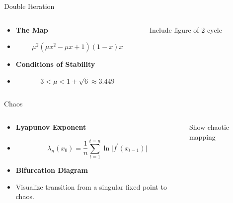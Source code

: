 \documentclass{beamer}
\begin{document}
\begin{frame}{Double Iteration}
	\begin{columns}
		\begin{column}{0.5\textwidth}
			\begin{itemize}
				\item
					\textbf{The Map}
				\item
					\begin{equation*}
						\mu^2(\mu x^2-\mu x+1)(1-x)x
					\end{equation*}
				\pause
				\item
					\textbf{Conditions of Stability}
				\item
					\begin{equation*}
						3<\mu<1+\sqrt{6}\approx3.449
					\end{equation*}
			\end{itemize}
		\end{column}
		\begin{column}{0.5\textwidth}
			Include figure of 2 cycle
		\end{column}
	\end{columns}
\end{frame}

\begin{frame}{Chaos}
	\begin{columns}
		\begin{column}{0.5\textwidth}
			\begin{itemize}
				\item
					\textbf{Lyapunov Exponent}
				\item
					\begin{equation*}
						\lambda_n(x_0)=\frac{1}{n}\sum\limits_{t=1}^{t=n}\ln\lvert f^\prime(x_{t-1})\rvert
					\end{equation*}
				\pause
				\item
					\textbf{Bifurcation Diagram}
				\item
					Visualize transition from a singular fixed point to chaos.
			\end{itemize}
		\end{column}
		\pause
		\begin{column}{0.5\textwidth}
			Show chaotic mapping
		\end{column}
	\end{columns}
\end{frame}
\end{document}
